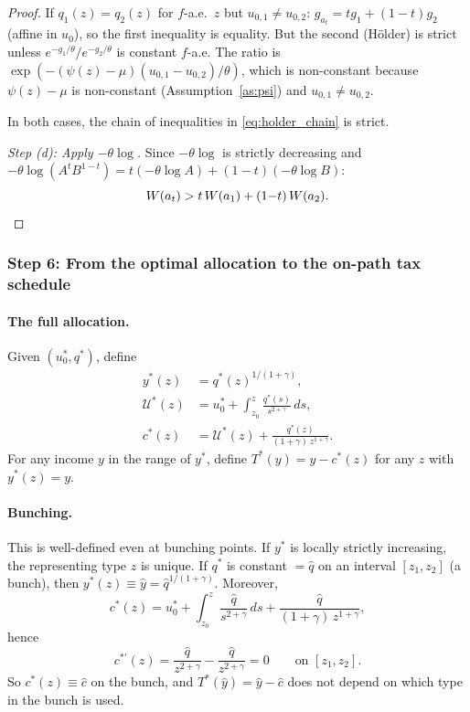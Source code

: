 \documentclass[12pt,a4paper]{article}
\theoremstyle{definition}
\theoremstyle{plain}
\theoremstyle{remark}
\newcommand{\zlow}{z_{\scriptscriptstyle 0}}
\newcommand{\calU}{\mathcal{U}}
\begin{document}
\begin{proof}
If $q_1(z) = q_2(z)$ for $f$-a.e.\ $z$ but
$u_{0,1} \neq u_{0,2}$:
$g_{a_t} = tg_1 + (1-t)g_2$ (affine in $u_0$), so the
first inequality is equality.  But the second
(H\"{o}lder) is strict unless
$e^{-g_1/\theta}/e^{-g_2/\theta}$ is constant $f$-a.e.
The ratio is
$\exp(-(\psi(z){-}\mu)(u_{0,1}{-}u_{0,2})/\theta)$,
which is non-constant because $\psi(z) - \mu$ is
non-constant (Assumption~\ref{as:psi}) and
$u_{0,1} \neq u_{0,2}$.

In both cases, the chain of inequalities in
\eqref{eq:holder_chain} is strict.

\emph{Step (d): Apply $-\theta\log$.}
Since $-\theta\log$ is strictly decreasing and
$-\theta\log(A^t B^{1-t}) = t(-\theta\log A)
+ (1-t)(-\theta\log B)$:
\[
  W(a_t)
  > t\,W(a_1) + (1{-}t)\,W(a_2).\qedhere
\]
\end{proof}


\subsubsection{Step 6: From the optimal allocation to
the on-path tax schedule}

\paragraph{The full allocation.}
Given $(u_0^*, q^*)$, define
\begin{align*}
  y^*(z) &= q^*(z)^{1/(1+\gamma)}, \\
  \calU^*(z) &= u_0^* + \int_{\zlow}^z
  \frac{q^*(s)}{s^{2+\gamma}}\,ds, \\
  c^*(z) &= \calU^*(z) +
  \frac{q^*(z)}{(1+\gamma)\,z^{1+\gamma}}.
\end{align*}
For any income $y$ in the range of $y^*$, define
$T^*(y) = y - c^*(z)$ for any $z$ with $y^*(z) = y$.

\paragraph{Bunching.}
This is well-defined even at bunching points.
If $y^*$ is locally strictly increasing, the representing
type $z$ is unique.  If $q^*$ is constant $= \hat q$
on an interval $[z_1, z_2]$ (a bunch), then
$y^*(z) \equiv \hat y = \hat q^{1/(1+\gamma)}$.
Moreover,
\[
  c^*(z) = u_0^* + \int_{\zlow}^z
  \frac{\hat q}{s^{2+\gamma}}\,ds
  + \frac{\hat q}{(1+\gamma)\,z^{1+\gamma}},
\]
hence
\[
  c^{*\prime}(z)
  = \frac{\hat q}{z^{2+\gamma}}
  - \frac{\hat q}{z^{2+\gamma}} = 0
  \qquad \text{on } [z_1, z_2].
\]
So $c^*(z) \equiv \hat c$ on the bunch, and
$T^*(\hat y) = \hat y - \hat c$ does not depend on
which type in the bunch is used.
\end{document}
